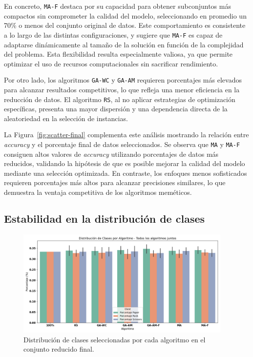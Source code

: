 En concreto, \texttt{MA-F} destaca por su capacidad para obtener subconjuntos más compactos sin comprometer la calidad del modelo,
seleccionando en promedio un 70\% o menos del conjunto original de datos.
Este comportamiento es consistente a lo largo de las distintas configuraciones,
y sugiere que \texttt{MA-F} es capaz de adaptarse dinámicamente al tamaño de la solución en función de la complejidad del problema.
Esta flexibilidad resulta especialmente valiosa, ya que permite optimizar el uso de recursos computacionales sin sacrificar rendimiento.

Por otro lado, los algoritmos \texttt{GA-WC} y \texttt{GA-AM} requieren porcentajes más elevados para alcanzar resultados competitivos,
lo que refleja una menor eficiencia en la reducción de datos.
El algoritmo \texttt{RS}, al no aplicar estrategias de optimización específicas,
presenta una mayor dispersión y una dependencia directa de la aleatoriedad en la selección de instancias.

La Figura~\ref{fig:scatter-final} complementa este análisis mostrando la relación entre \textit{accuracy} y el porcentaje final de datos seleccionados.
Se observa que \texttt{MA} y \texttt{MA-F} consiguen altos valores de \textit{accuracy} utilizando porcentajes de datos más reducidos,
validando la hipótesis de que es posible mejorar la calidad del modelo mediante una selección optimizada.
En contraste, los enfoques menos sofisticados requieren porcentajes más altos para alcanzar precisiones similares,
lo que demuestra la ventaja competitiva de los algoritmos meméticos.

\subsection{Estabilidad en la distribución de clases}\label{sec:distribucion-clases-final}
\begin{figure}[htp]
  \centering
  \includegraphics[width=0.95\textwidth]{imagenes/evaluaciones/final/distribucion-de-clases.png}
  \caption{Distribución de clases seleccionadas por cada algoritmo en el conjunto reducido final.}
  \label{fig:distribucion-de-clases-final}
\end{figure}

